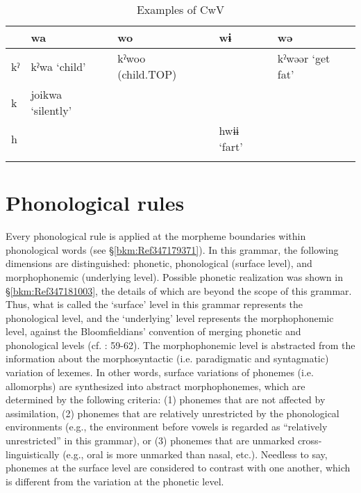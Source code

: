 \begin{table}
\caption{Examples of CwV}
\begin{tabularx}{\textwidth}{lllQl}
\lsptoprule
& {wa}    & {wo}   & {wɨ}   & {wə}  \\\midrule
{kˀ} & {kˀwa}  {‘child’} & {kˀwoo}  {(child.TOP)}  &    & {kˀwəər}  {‘get fat’}\\
{k} & {joikwa}  {‘silently’}            \\
{h}  &                       &                        & {hwɨɨ}  {‘fart’}    \\
\lspbottomrule
\end{tabularx}
\end{table}

\section{Phonological rules}
\hypertarget{RefHeadingToc395696977}{}\label{bkm:Ref302723494}
Every phonological rule is applied at the morpheme boundaries within phonological words (see §\ref{bkm:Ref347179371}). In this grammar, the following dimensions are distinguished: phonetic, phonological (surface level), and morphophonemic (underlying level). Possible phonetic realization was shown in §\ref{bkm:Ref347181003}, the details of which are beyond the scope of this grammar. Thus, what is called the ‘surface’ level in this grammar represents the phonological level, and the ‘underlying’ level represents the morphophonemic level, against the Bloomfieldians’ convention of merging phonetic and phonological levels (cf. \citealt{Lass1984}: 59-62). The morphophonemic level is abstracted from the information about the morphosyntactic (i.e. paradigmatic and syntagmatic) variation of lexemes. In other words, surface variations of phonemes (i.e. allomorphs) are synthesized into abstract morphophonemes, which are determined by the following criteria: (1) phonemes that are not affected by assimilation, (2) phonemes that are relatively unrestricted by the phonological environments (e.g., the environment before vowels is regarded as “relatively unrestricted” in this grammar), or (3) phonemes that are unmarked cross-linguistically (e.g., oral is more unmarked than nasal, etc.). Needless to say, phonemes at the surface level are considered to contrast with one another, which is different from the variation at the phonetic level.

